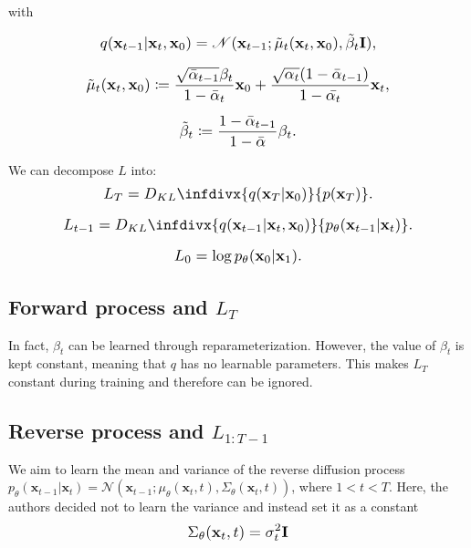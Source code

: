 \documentclass{article}
\newcommand{\infdiv}{D_{KL}\infdivx}
\newcommand*{\Scale}[2][4]{\scalebox{#1}{\ensuremath{#2}}}
\begin{document}
with
 
\begin{equation}
\Scale[1.2]{ \displaystyle
q(\textbf{x}_{t-1}|\textbf{x}_t,\textbf{x}_0) = \mathscr{N}(\textbf{x}_{t-1};\tilde{\mu}_t(\textbf{x}_{t},\textbf{x}_0),\tilde{\beta}_t\textbf{I}), }
\end{equation}

\begin{equation}
\Scale[1.2]{ \displaystyle
\tilde{\mu}_t(\textbf{x}_{t},\textbf{x}_0) \coloneq \frac{
\sqrt{\bar{\alpha}_{t-1}}\beta_t
}
{
1 - \bar{\alpha}_t
}
\textbf{x}_0 
+
\frac{
\sqrt{\alpha_{t}}(1-\bar{\alpha}_{t-1})
}
{
1 - \bar{\alpha_t}
}
\textbf{x}_t, }
\end{equation}

\begin{equation}
\Scale[1.2]{ \displaystyle
\tilde{\beta}_t \coloneq 
\frac{
1-\bar{\alpha}_{t-1}
}
{
1-\bar{\alpha}
}
\beta_t. }
\end{equation}

We can decompose $ L $ into:
\begin{equation}
\Scale[1.2]{ \displaystyle
L_T = 
\infdiv{q(\textbf{x}_T|\textbf{x}_0)}{p(\textbf{x}_T)}. }
\end{equation}

\begin{equation}
\Scale[1.2]{ \displaystyle
L_{t-1} = 
\infdiv{ 
q(\textbf{x}_{t-1}|\textbf{x}_t,\textbf{x}_0)
}
{
p_\theta(\textbf{x}_{t-1}|\textbf{x}_{t})
}. }
\end{equation}

\begin{equation}
\Scale[1.2]{ \displaystyle
L_{0} = 
\log p_\theta(\textbf{x}_0|\textbf{x}_1). }
\end{equation}


\subsection{Forward process and $ L_T $}
In fact, $ \beta_t $ can be learned through reparameterization. However, the value of $ \beta_t $ is kept constant, meaning that $ q $ has no learnable parameters. This makes $ L_T $ constant during training and therefore can be ignored.


\subsection{Reverse process and $ L_{1:T-1} $}
We aim to learn the mean and variance of the reverse diffusion process $ p_\theta(\textbf{x}_{t-1}|\textbf{x}_{t}) = \mathscr{N}(\textbf{x}_{t-1};\mu_\theta(\textbf{x}_{t},t),\Sigma_\theta(\textbf{x}_t, t)) $, where $ 1 < t < T  $. Here, the authors decided not to learn the variance and instead set it as a constant
\begin{equation}
\Scale[1.2]{ \displaystyle
\Sigma_\theta(\textbf{x}_t, t) = \sigma_t^2 \textbf{I} }
\end{equation}
\end{document}
